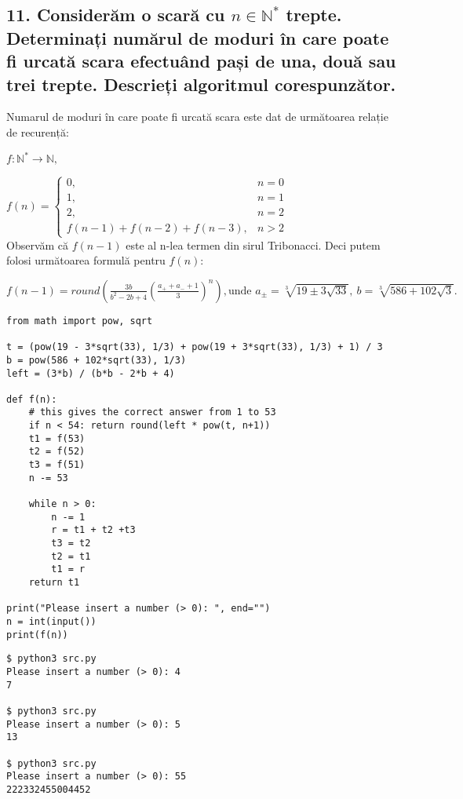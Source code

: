 \documentclass[11pt]{article}
\begin{document}
\begin{itemize}
\subsection*{11. Considerăm o scară cu \(n \in \mathbb{N}^*\) trepte. Determinați numărul de moduri în care poate fi urcată scara efectuând pași de una, două sau trei trepte. Descrieți algoritmul corespunzător.}
\label{sec:orgd79218c}

Numarul de moduri în care poate fi urcată scara este dat de următoarea relație de recurență:

$f : \mathbb{N}^* \to \mathbb{N},$

$
f(n) = 
\begin{cases}
0, & n = 0\\
1, & n = 1\\
2, & n = 2\\
f(n-1)+f(n-2)+f(n-3), & n > 2
\end{cases}
$\\
Observăm că $f(n-1)$ este al n-lea termen din sirul Tribonacci. Deci putem folosi următoarea formulă pentru $f(n)$:

$
f(n - 1) = \mathit{round} \left( 
   \frac{3b} {b^2-2b+4}
   \left(
   \frac{a_++a_-+1}{3}
   \right)^n
  \right),
\text{unde } a_{\pm} = \sqrt[3]{19 \pm 3 \sqrt{33}},\ b = \sqrt[3]{586+102\sqrt{3}}.
$

\begin{verbatim}
from math import pow, sqrt

t = (pow(19 - 3*sqrt(33), 1/3) + pow(19 + 3*sqrt(33), 1/3) + 1) / 3
b = pow(586 + 102*sqrt(33), 1/3)
left = (3*b) / (b*b - 2*b + 4)

def f(n):
    # this gives the correct answer from 1 to 53
    if n < 54: return round(left * pow(t, n+1))
    t1 = f(53)
    t2 = f(52)
    t3 = f(51)
    n -= 53

    while n > 0:
        n -= 1
        r = t1 + t2 +t3
        t3 = t2
        t2 = t1
        t1 = r
    return t1

print("Please insert a number (> 0): ", end="")
n = int(input())
print(f(n))
\end{verbatim}

\begin{verbatim}
$ python3 src.py
Please insert a number (> 0): 4
7

$ python3 src.py
Please insert a number (> 0): 5
13

$ python3 src.py
Please insert a number (> 0): 55
222332455004452
\end{verbatim}


\end{itemize}
\end{document}
